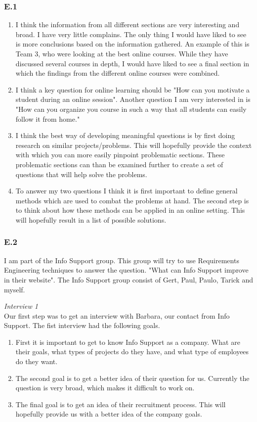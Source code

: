\documentclass[]{article}
\begin{document}
\subsubsection*{E.1}
\begin{enumerate}[\textbf{a.}]
    \item I think the information from all different sections are very interesting 
    and broad. I have very little complains. The only thing I would have liked 
    to see is more conclusions based on the information gathered. An example of 
    this is Team 3, who were looking at the best online courses. While they have 
    discussed several courses in depth, I would have liked to see a final section
    in which the findings from the different online courses were combined.
    \item I think a key question for online learning should be "How can you 
    motivate a student during an online session". Another question I am very 
    interested in is "How can you organize you course in such a way that all 
    students can easily follow it from home."
    \item I think the best way of developing meaningful questions is by first 
    doing research on similar projects/problems. This will hopefully provide 
    the context with which you can more easily pinpoint problematic sections. 
    These problematic sections can than be examined further to create a set 
    of questions that will help solve the problems. 
    \item To answer my two questions I think it is first important to define general
    methods which are used to combat the problems at hand. The second step is to 
    think about how these methods can be applied in an online setting. 
    This will hopefully result in a list of possible solutions.
\end{enumerate}

\subsubsection*{E.2} \label{3.E.2}
I am part of the Info Support group. This group will try to use Requirements 
Engineering techniques to answer the question. "What can Info Support improve
in their website". 
The Info Support group consist of Gert, Paul, Paulo, Tarick and myself. 

\noindent\textit{Interview 1}\\
Our first step was to get an interview with Barbara, our contact from Info Support.
The fist interview had the following goals. 
\begin{enumerate}
    \item First it is important to get to 
    know Info Support as a company. What are their goals, what types of projects 
    do they have, and what type of employees do they want.
    \item The second goal is to 
    get a better idea of their question for us. Currently the question is very 
    broad, which makes it difficult to work on. 
    \item The final goal is to get an idea of their recruitment process. 
    This will hopefully provide us with a better idea of the company goals.
\end{enumerate}
\end{document}
